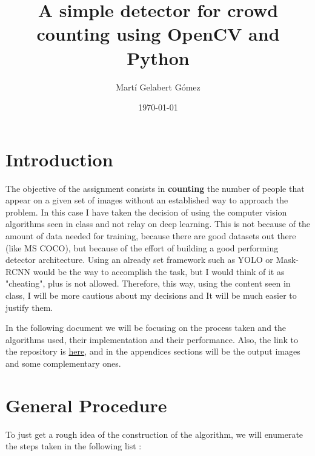 \documentclass[10pt]{article}
\begin{document}
\title{A simple detector for crowd counting using OpenCV and Python}
\author{Martí Gelabert Gómez}
\date{\today}
\maketitle

\tableofcontents
\section{Introduction}
The objective of the assignment consists in \textbf{counting} the number of people that appear on a given set of images without an established way to approach the problem. In this case I have taken the decision of using the computer vision algorithms seen in class and not relay on deep learning. This is not because of the amount of data needed for training, because there are good datasets out there (like MS COCO), but because of the effort of building a good performing detector architecture. Using an already set framework such as YOLO or Mask-RCNN would be the way to accomplish the task, but I would think of it as "cheating", plus is not allowed. Therefore, this way, using the content seen in class, I will be more cautious about my decisions and It will be much easier to justify them.\medskip

In the following document  we will be focusing on the process taken and the algorithms used, their implementation and their performance. Also, the link to the repository is \href{https://github.com/martigelabert/Gelabert_person_detector.git}{here}, and in the appendices sections will be the output images and some complementary ones.

\section{General Procedure}
To just get a rough idea of the construction of the algorithm, we will enumerate the steps taken in the following list :
\end{document}
